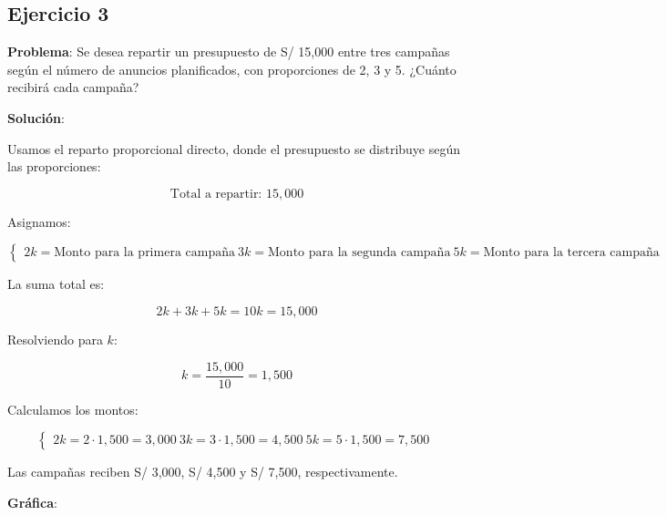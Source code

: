 \documentclass[
  stu,
  floatsintext,
  longtable,
  a4paper,
  nolmodern,
  notxfonts,
  notimes,
  12pt,
  colorlinks=true,linkcolor=blue,citecolor=blue,urlcolor=blue]{apa7}
\begin{document}
\subsection{Ejercicio 3}\label{ejercicio-3}

\textbf{Problema}: Se desea repartir un presupuesto de S/ 15,000 entre
tres campañas según el número de anuncios planificados, con proporciones
de 2, 3 y 5. ¿Cuánto recibirá cada campaña?

\textbf{Solución}:

Usamos el reparto proporcional directo, donde el presupuesto se
distribuye según las proporciones:

\[
\text{Total a repartir: } 15,000
\]

Asignamos:

\[
\begin{cases}
2k = \text{Monto para la primera campaña} \
3k = \text{Monto para la segunda campaña} \
5k = \text{Monto para la tercera campaña} \
\end{cases}
\]

La suma total es:

\[
2k + 3k + 5k = 10k = 15,000
\]

Resolviendo para \(k\):

\[
k = \frac{15,000}{10} = 1,500
\]

Calculamos los montos:

\[
\begin{cases}
2k = 2 \cdot 1,500 = 3,000 \
3k = 3 \cdot 1,500 = 4,500 \
5k = 5 \cdot 1,500 = 7,500 \
\end{cases}
\]

Las campañas reciben S/ 3,000, S/ 4,500 y S/ 7,500, respectivamente.

\textbf{Gráfica}:
\end{document}
